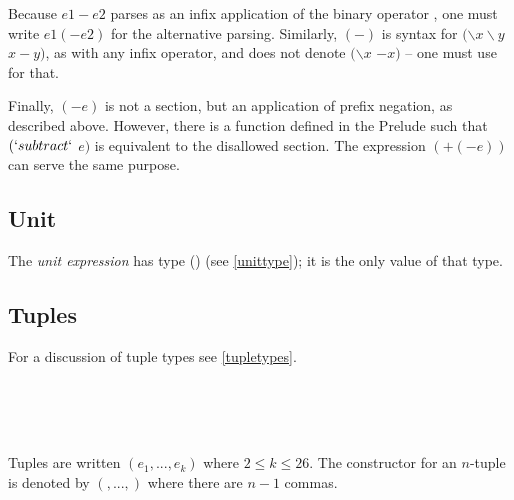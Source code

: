Because
$e1-e2$ parses as an infix application of the binary operator \term{$-$}, one must write $e1 (-e2)$ for the alternative
parsing. Similarly, $(-)$ is syntax for $(\backslash x \backslash y$ \arrow{} $x-y)$, 
as with any infix operator, and does not denote
$(\backslash x$ \arrow{} $-x)$ -- one must use  for that.

Finally, $(- e)$ is not a section, but an application of prefix negation,
as described above. However, there is a  function defined in the Prelude such
that $(`subtract`$  $e)$ is equivalent to the disallowed section. The expression $(+ (- e))$ can serve the
same purpose.


\subsection{Unit}

The \emph{unit expression} \sym{()} has type () (see \autoref{unittype}); it is the only value of that type.

\subsection{Tuples} \label{tupleterm} 

For a discussion of tuple types see \autoref{tupletypes}.

\begin{flushleft}
  \oder{}  \oder{} \\
 \sym{(,}\some{\sym{,}}\sym{)}\\
 \sym{(}\sym{,} \sym{)}\\
 \sym{(}\sym{;} \sym{)}
\end{flushleft}

Tuples are written $(e_1, ..., e_k)$ where $2\le k \le 26$.
The constructor for an $n$-tuple is denoted by $(,...,)$ where there are $n-1$ commas.

